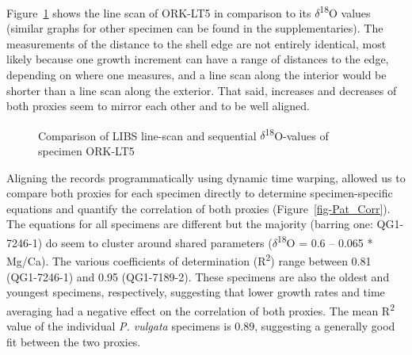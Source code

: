 \documentclass[
  authoryear,
  preprint,
  3p]{elsarticle}
\begin{document}
Figure~\ref{fig-Pat_Comp} shows the line scan of ORK-LT5 in comparison
to its $\delta$\textsuperscript{18}O values (similar graphs for other
specimen can be found in the supplementaries). The measurements of the
distance to the shell edge are not entirely identical, most likely
because one growth increment can have a range of distances to the edge,
depending on where one measures, and a line scan along the interior
would be shorter than a line scan along the exterior. That said,
increases and decreases of both proxies seem to mirror each other and to
be well aligned.

\begin{figure}


\caption{\label{fig-Pat_Comp}Comparison of LIBS line-scan and sequential
$\delta$\textsuperscript{18}O-values of specimen ORK-LT5}

\end{figure}%

Aligning the records programmatically using dynamic time warping,
allowed us to compare both proxies for each specimen directly to
determine specimen-specific equations and quantify the correlation of
both proxies (Figure~\ref{fig-Pat_Corr}). The equations for all
specimens are different but the majority (barring one: QG1-7246-1) do
seem to cluster around shared parameters
($\delta$\textsuperscript{18}O = 0.6 -- 0.065 * Mg/Ca). The various
coefficients of determination (R\textsuperscript{2}) range between 0.81
(QG1-7246-1) and 0.95 (QG1-7189-2). These specimens are also the oldest
and youngest specimens, respectively, suggesting that lower growth rates
and time averaging had a negative effect on the correlation of both
proxies. The mean R\textsuperscript{2} value of the individual \emph{P.
vulgata} specimens is 0.89, suggesting a generally good fit between the
two proxies.
\end{document}
